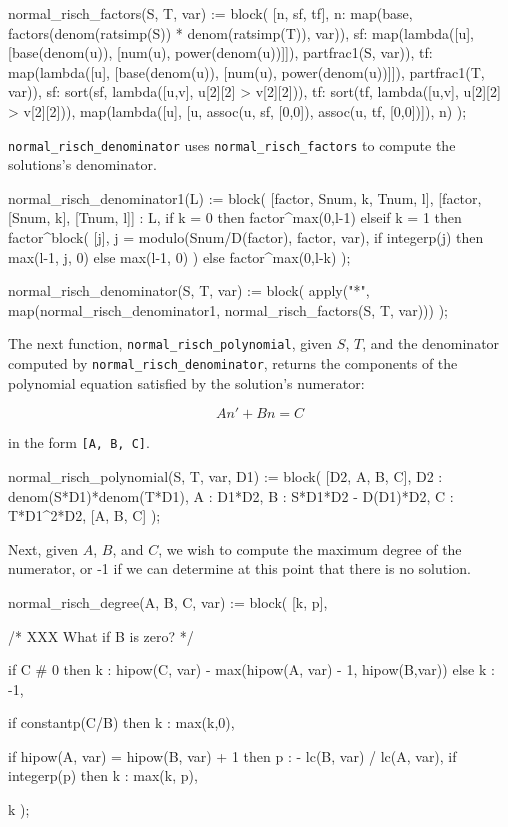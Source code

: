 \begin{maximacommon}
normal_risch_factors(S, T, var) := block(
   [n, sf, tf],
   n: map(base,
          factors(denom(ratsimp(S))
                  * denom(ratsimp(T)), var)),
   sf: map(lambda([u], [base(denom(u)),
                        [num(u), power(denom(u))]]),
           partfrac1(S, var)),
   tf: map(lambda([u], [base(denom(u)),
                        [num(u), power(denom(u))]]),
           partfrac1(T, var)),
   sf: sort(sf, lambda([u,v], u[2][2] > v[2][2])),
   tf: sort(tf, lambda([u,v], u[2][2] > v[2][2])),
   map(lambda([u], [u, assoc(u, sf, [0,0]),
                       assoc(u, tf, [0,0])]), n)
);
\end{maximacommon}

{\tt normal_risch_denominator} uses {\tt normal_risch_factors}
to compute the solutions's denominator.

\begin{maximacommon}
normal_risch_denominator1(L) := block(
   [factor, Snum, k, Tnum, l],
   [factor, [Snum, k], [Tnum, l]] : L,
   if k = 0 then factor^max(0,l-1)
   elseif k = 1 then factor^block(
      [j],
      j = modulo(Snum/D(factor), factor, var),
      if integerp(j) then max(l-1, j, 0)
                     else max(l-1, 0)
   )
   else factor^max(0,l-k)
);

normal_risch_denominator(S, T, var) := block(
   apply("*",
      map(normal_risch_denominator1,
         normal_risch_factors(S, T, var)))
);
\end{maximacommon}

The next function, {\tt normal_risch_polynomial}, given $S$, $T$, and
the denominator computed by {\tt normal_risch_denominator},
returns the components of the polynomial equation
satisfied by the solution's numerator:

$$A n' + B n = C$$

in the form {\tt [A, B, C]}.

\begin{maximacommon}
normal_risch_polynomial(S, T, var, D1) := block(
   [D2, A, B, C],
   D2 : denom(S*D1)*denom(T*D1),
   A : D1*D2,
   B : S*D1*D2 - D(D1)*D2,
   C : T*D1^2*D2,
   [A, B, C]
);
\end{maximacommon}

Next, given $A$, $B$, and $C$, we wish to compute the
maximum degree of the numerator, or -1 if we can
determine at this point that there is no solution.

\begin{maximacommon}
normal_risch_degree(A, B, C, var) := block(
   [k, p],

   /* XXX What if B is zero? */

   if C # 0 then
      k : hipow(C, var) - max(hipow(A, var) - 1,
                              hipow(B,var))
   else
      k : -1,

   if constantp(C/B) then k : max(k,0),

   if hipow(A, var) = hipow(B, var) + 1
   then
      p : - lc(B, var) / lc(A, var),
      if integerp(p) then k : max(k, p),

   k
);
\end{maximacommon}

